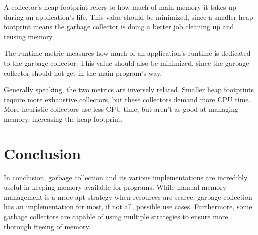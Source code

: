 \documentclass[12pt]{article}
\begin{document}
A collector's heap footprint refers to how much of main memory it takes up during an application's life. This value should be minimized, since a smaller heap footprint means the garbage collector is doing a better job cleaning up and reusing memory.

The runtime metric measures how much of an application's runtime is dedicated to the garbage collector. This value should also be minimized, since the garbage collector should not get in the main program's way.

Generally speaking, the two metrics are inversely related. Smaller heap footprints require more exhaustive collectors, but these collectors demand more CPU time. More heuristic collectors use less CPU time, but aren't as good at managing memory, increasing the heap footprint. \cite{perform}
\section{Conclusion}
In conclusion, garbage collection and its various implementations are incredibly useful in keeping memory available for programs. While manual memory management is a more apt strategy when resources are scarce, garbage collection has an implementation for most, if not all, possible use cases. Furthermore, some garbage collectors are capable of using multiple strategies to ensure more thorough freeing of memory.
\newpage



%

  
  



\end{document}
